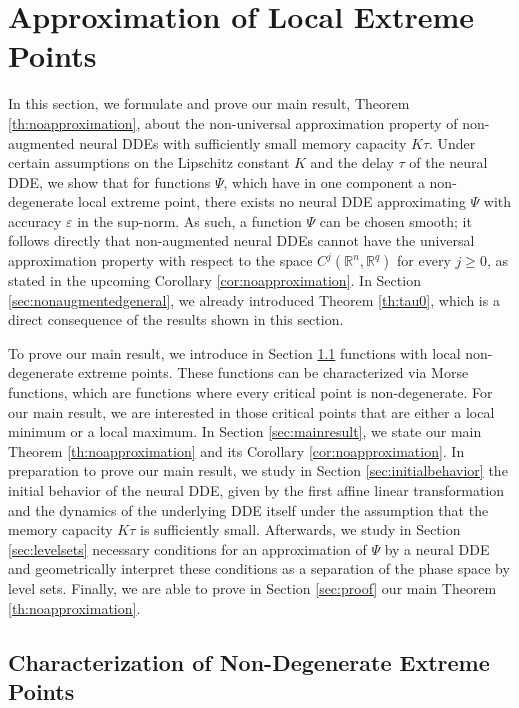\documentclass[10pt]{article}
\numberwithin{equation}{section}
\newcommand{\eps}{\varepsilon}
\begin{document}
	
	
	\section{Approximation of Local Extreme Points}
	\label{sec:sectionproof}
	
	In this section, we formulate and prove our main result, Theorem \ref{th:noapproximation}, about the non-universal approximation property of non-augmented neural DDEs with sufficiently small memory capacity $K \tau$. Under certain assumptions on the Lipschitz constant $K$ and the delay $\tau$ of the neural DDE, we show that for functions $\Psi$, which have in one component a non-degenerate local extreme point, there exists no neural DDE approximating $\Psi$ with accuracy $\eps$ in the sup-norm. As such, a function $\Psi$ can be chosen smooth; it follows directly that non-augmented neural DDEs cannot have the universal approximation property with respect to the space $ C^j(\mathbb{R}^n,\mathbb{R}^q)$ for every $j \geq 0$, as stated in the upcoming Corollary \ref{cor:noapproximation}. In Section \ref{sec:nonaugmentedgeneral}, we already introduced Theorem \ref{th:tau0}, which is a direct consequence of the results shown in this section. 
	
	To prove our main result, we introduce in Section \ref{sec:nondegenerateCP} functions with local non-degenerate extreme points. These functions can be characterized via Morse functions, which are functions where every critical point is non-degenerate. For our main result, we are interested in those critical points that are either a local minimum or a local maximum. In Section \ref{sec:mainresult}, we state our main Theorem \ref{th:noapproximation} and its Corollary \ref{cor:noapproximation}. In preparation to prove our main result, we study in Section \ref{sec:initialbehavior} the initial behavior of the neural DDE, given by the first affine linear transformation and the dynamics of the underlying DDE itself under the assumption that the memory capacity $K\tau$ is sufficiently small. Afterwards, we study in Section \ref{sec:levelsets} necessary conditions for an approximation of $\Psi$ by a neural DDE and geometrically interpret these conditions as a separation of the phase space by level sets. Finally, we are able to prove in Section \ref{sec:proof} our main Theorem \ref{th:noapproximation}.
	
	\subsection{Characterization of Non-Degenerate Extreme Points}
	\label{sec:nondegenerateCP}
	
\end{document}
